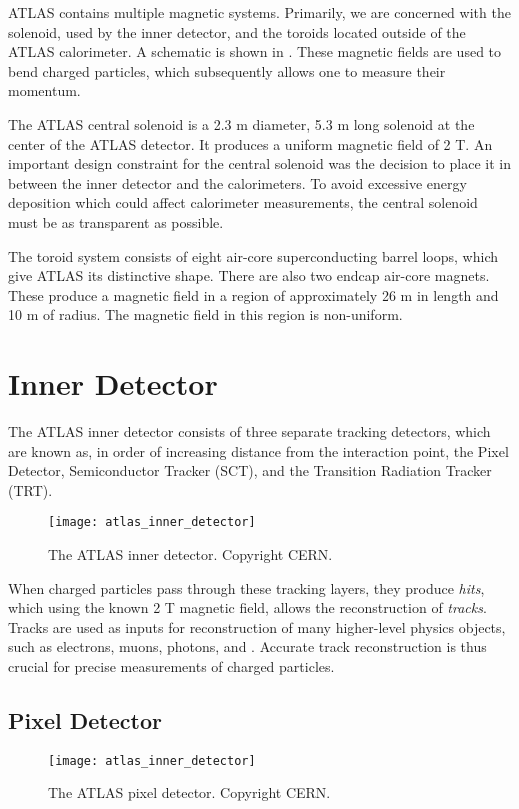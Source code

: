 ATLAS contains multiple magnetic systems.
Primarily, we are concerned with the solenoid, used by the inner detector, and the toroids located outside of the ATLAS calorimeter.
A schematic is shown in .
These magnetic fields are used to bend charged particles, which subsequently allows one to measure their momentum.

The ATLAS central solenoid is a 2.3 m diameter, 5.3 m long solenoid at the center of the ATLAS detector.
It produces a uniform magnetic field of 2 T.
An important design constraint for the central solenoid was the decision to place it in between the inner detector and the calorimeters.
To avoid excessive energy deposition which could affect calorimeter measurements, the central solenoid must be as transparent as possible\footnotemark.

The toroid system consists of eight air-core superconducting barrel loops, which give ATLAS its distinctive shape.
There are also two endcap air-core magnets.
These produce a magnetic field in a region of approximately 26 m in length and 10 m of radius.
The magnetic field in this region is non-uniform.

\section{Inner Detector}

The ATLAS inner detector consists of three separate tracking detectors, which are known as, in order of increasing distance from the interaction point, the Pixel Detector, Semiconductor Tracker (SCT), and the Transition Radiation Tracker (TRT).
\begin{figure}[tbp]
\caption{The ATLAS inner detector. Copyright CERN.} \label{fig:atlas_inner_detector}
\texttt{[image: atlas\_inner\_detector]}
\end{figure}
When charged particles pass through these tracking layers, they produce \textit{hits}, which using the known 2 T magnetic field, allows the reconstruction of \textit{tracks}.
Tracks are used as inputs for reconstruction of many higher-level physics objects, such as electrons, muons, photons, and \met.
Accurate track reconstruction is thus crucial for precise measurements of charged particles.

\subsection{Pixel Detector}
\begin{figure}[tbp]
\caption{The ATLAS pixel detector. Copyright CERN.} \label{fig:atlas_inner_detector}
\texttt{[image: atlas\_inner\_detector]}
\end{figure}


